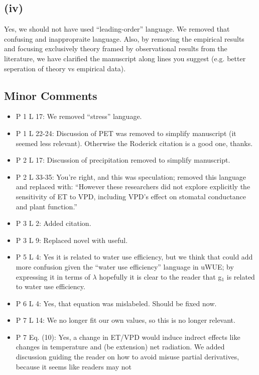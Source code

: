 \documentclass[12pt]{article}
\begin{document}
\subsection{(iv)}

Yes, we should not have used ``leading-order'' language. We removed
that confusing and inappropraite language. Also, by removing the
empirical results and focusing exclusively theory framed by observational
results from the literature, we have clarified the manuscript along
lines you suggest (e.g. better seperation of theory vs empirical
data).

\subsection{Minor Comments}

\begin{itemize}
\item P 1 L 17: We removed ``stress'' language.
\item P 1 L 22-24: Discussion of PET was removed to simplify
  manuscript (it seemed less relevant). Otherwise the Roderick
  citation is a good one, thanks.
\item P 2 L 17: Discussion of precipitation removed to simplify
  manuscript.
\item P 2 L 33-35: You're right, and this was speculation; removed
  this language and replaced with: ``However these researchers did not
  explore explicitly the sensitivity of ET to VPD, including VPD's
  effect on stomatal conductance and plant function.''
\item P 3 L 2: Added citation.
\item P 3 L 9: Replaced novel with useful.
\item P 5 L 4: Yes it is related to water use efficiency, but we think
  that could add more confusion given the ``water use efficiency''
  language in uWUE; by expressing it in terms of $\lambda$ hopefully
  it is clear to the reader that g$_1$ is related to water use
  efficiency.
\item P 6 L 4: Yes, that equation was mislabeled. Should be fixed now.
\item P 7 L 14: We no longer fit our own values, so this is no
  longer relevant.
\item P 7 Eq. (10): Yes, a change in ET/VPD would induce indrect
  effects like changes in temperature and (be extension) net
  radiation. We added discussion guiding the reader on how to avoid
  misuse partial derivatives, because it seems like readers may not

\end{itemize}
\end{document}
